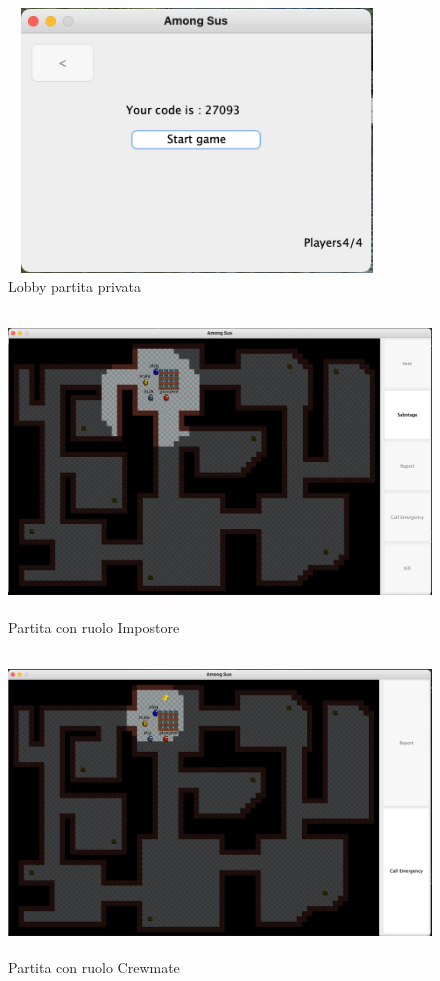 \begin{figure}[ht]
\centering
\includegraphics[width=10cm, height=7cm]{img/lobby-frame.jpeg}
\caption{Lobby partita privata}
\end{figure}

\begin{figure}[ht]
\centering
\includegraphics[width=12cm, height=8cm]{img/impostor-game.jpeg}
\caption{Partita con ruolo Impostore}
\end{figure}

\begin{figure}[ht]
\centering
\includegraphics[width=12cm, height=8cm]{img/crewmate-game.jpeg}
\caption{Partita con ruolo Crewmate}
\end{figure}